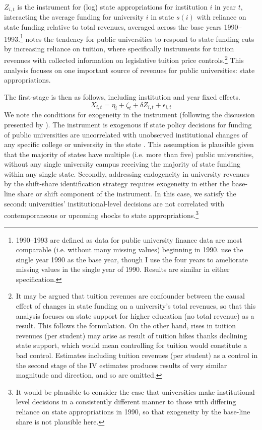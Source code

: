 \documentclass[notitlepage,12pt]{article}
\begin{document}
$Z_{i,t}$ is the instrument for (log) state appropriations for institution $i$ in year $t$, interacting the average funding for university $i$ in state $s(i)$ with reliance on state funding relative to total revenues, averaged across the base years 1990--1993.\footnote{
    1990--1993 are defined as data for public university finance data are most comparable (i.e. without many missing values) beginning in 1990.
    \cite{NBERw23736} use the single year 1990 as the base year, though I use the four years to ameliorate missing values in the single year of 1990.
    Results are similar in either specification.
}
\cite{NBERw27885} notes the tendency for public universities to respond to state funding cuts by increasing reliance on tuition, where \cite{NBERw23736} specifically instruments for tuition revenues with collected information on legislative tuition price controls.\footnote{
    \label{foot:control}
    It may be argued that tuition revenues are confounder between the causal effect of changes in state funding on a university's total revenues, so that this analysis focuses on state support for higher education (no total revenue) as a result.
    This follows the \cite{NBERw27885} formulation.
    On the other hand, rises in tuition revenues (per student) may arise as result of tuition hikes thanks declining state support, which would mean controlling for tuition would constitute a bad control.
    Estimates including tuition revenues (per student) as a control in the second stage of the IV estimates produces results of very similar magnitude and direction, and so are omitted.
}
This analysis focuses on one important source of revenues for public universities: state appropriations.

The first-stage is then as follows, including institution and year fixed effects.
\begin{equation}
    \label{eqn:firststage}
    X_{i,t} = \eta_i + \zeta_t + \delta Z_{i,t} + \epsilon_{i,t}
\end{equation}
We note the conditions for exogeneity in the instrument (following the discussion presented by \citealt{NBERw27885}).
The instrument is exogenous if state policy decisions for funding of public universities are uncorrelated with unobserved institutional changes of any specific college or university in the state \citep{borusyak2022quasi}.
This assumption is plausible given that the majority of states have multiple (i.e. more than five) public universities, without any single university campus receiving the majority of state funding within any single state.
Secondly, addressing endogeneity in university revenues by the shift-share identification strategy requires exogeneity in either the base-line share or shift component of the instrument.
In this case, we satisfy the second: universities' institutional-level decisions are not correlated with contemporaneous or upcoming shocks to state appropriations.\footnote{
    It would be plausible to consider the case that universities make institutional-level decisions in a consistently different manner to those 
    with differing reliance on state appropriations in 1990, so that exogeneity by the base-line share is not plausible here.
}
\end{document}
